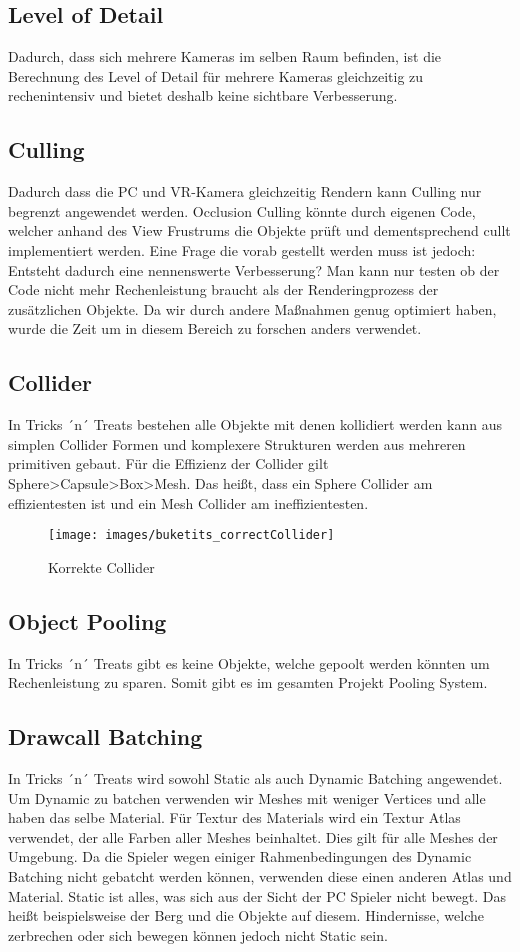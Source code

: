 \subsection{Level of Detail}
Dadurch, dass sich mehrere Kameras im selben Raum befinden, ist die Berechnung des Level of Detail für mehrere Kameras gleichzeitig zu rechenintensiv und bietet deshalb keine sichtbare Verbesserung.

\subsection{Culling}
Dadurch dass die PC und VR-Kamera gleichzeitig Rendern kann Culling nur begrenzt angewendet werden. Occlusion Culling könnte durch eigenen Code, welcher anhand des View Frustrums die Objekte prüft und dementsprechend cullt implementiert werden. Eine Frage die vorab gestellt werden muss ist jedoch: Entsteht dadurch eine nennenswerte Verbesserung? Man kann nur testen ob der Code nicht mehr Rechenleistung braucht als der Renderingprozess der zusätzlichen Objekte. Da wir durch andere Maßnahmen genug optimiert haben, wurde die Zeit um in diesem Bereich zu forschen anders verwendet.

\subsection{Collider}
 In Tricks ´n´ Treats bestehen alle Objekte mit denen kollidiert werden kann aus simplen Collider Formen und komplexere Strukturen werden aus mehreren primitiven gebaut. 
 Für die Effizienz der Collider gilt Sphere>Capsule>Box>Mesh. Das heißt, dass ein Sphere Collider am effizientesten ist und ein Mesh Collider am ineffizientesten.
\begin{figure}[H]
	\centering
	\texttt{[image: images/buketits\_correctCollider]}
	\caption{Korrekte Collider}
\end{figure}

\subsection{Object Pooling}
In Tricks ´n´ Treats gibt es keine Objekte, welche gepoolt werden könnten um Rechenleistung zu sparen. Somit gibt es im gesamten Projekt Pooling System.

\subsection{Drawcall Batching}
In Tricks ´n´ Treats wird sowohl Static als auch Dynamic Batching angewendet. Um Dynamic zu batchen verwenden wir Meshes mit weniger Vertices und alle haben das selbe Material. Für Textur des Materials wird ein Textur Atlas verwendet, der alle Farben aller Meshes beinhaltet. Dies gilt für alle Meshes der Umgebung. Da die Spieler wegen einiger Rahmenbedingungen des Dynamic Batching nicht gebatcht werden können, verwenden diese einen anderen Atlas und Material. Static ist alles, was sich aus der Sicht der PC Spieler nicht bewegt. Das heißt beispielsweise der Berg und die Objekte auf diesem. Hindernisse, welche zerbrechen oder sich bewegen können jedoch nicht Static sein.

